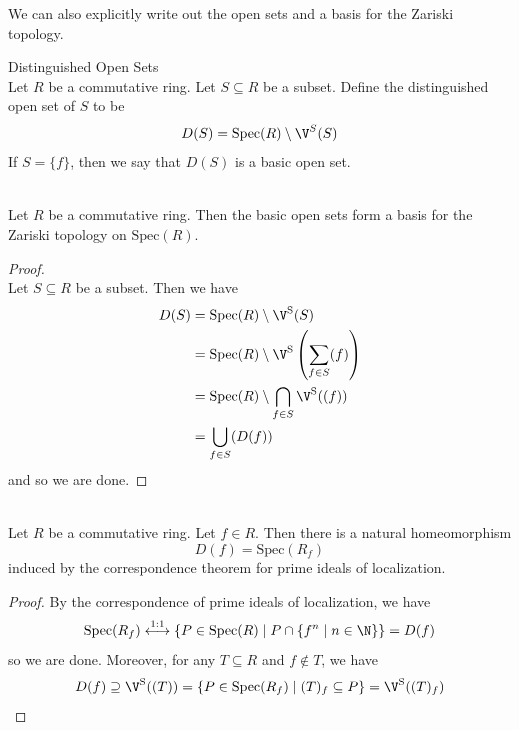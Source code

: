 \documentclass[a4paper]{article}
\begin{document}
We can also explicitly write out the open sets and a basis for the Zariski topology. 

\begin{defn}{Distinguished Open Sets}{}\\
Let $R$ be a commutative ring. Let $S\subseteq R$ be a subset. Define the distinguished open set of $S$ to be $$D(S)=\text{Spec}(R)\setminus\V^S(S)$$ If $S=\{f\}$, then we say that $D(S)$ is a basic open set. 
\end{defn}

\begin{lmm}{}{}\\
Let $R$ be a commutative ring. Then the basic open sets form a basis for the Zariski topology on $\text{Spec}(R)$. 
\begin{proof}\\
Let $S\subseteq R$ be a subset. Then we have 
\begin{align*}
D(S)&=\text{Spec}(R)\setminus\V^\text{S}(S)\\
&=\text{Spec}(R)\setminus\V^\text{S}\left(\sum_{f\in S}(f)\right)\\
&=\text{Spec}(R)\setminus\bigcap_{f\in S}\V^\text{S}((f))\\
&=\bigcup_{f\in S}(D(f))
\end{align*}
and so we are done. 
\end{proof}
\end{lmm}

\begin{lmm}{}{}\\
Let $R$ be a commutative ring. Let $f\in R$. Then there is a natural homeomorphism $$D(f)=\text{Spec}(R_f)$$ induced by the correspondence theorem for prime ideals of localization. 
\begin{proof}
By the correspondence of prime ideals of localization, we have $$\text{Spec}(R_f)\overset{1:1}{\longleftrightarrow}\{P\in\text{Spec}(R)\;|\;P\cap\{f^n\;|\;n\in\N\}\}=D(f)$$ so we are done. Moreover, for any $T\subseteq R$ and $f\notin T$, we have $$D(f)\supseteq\V^\text{S}((T))=\{P\in\text{Spec}(R_f)\;|\;(T)_f\subseteq P\}=\V^\text{S}((T)_f)$$
\end{proof}
\end{lmm}
\end{document}
